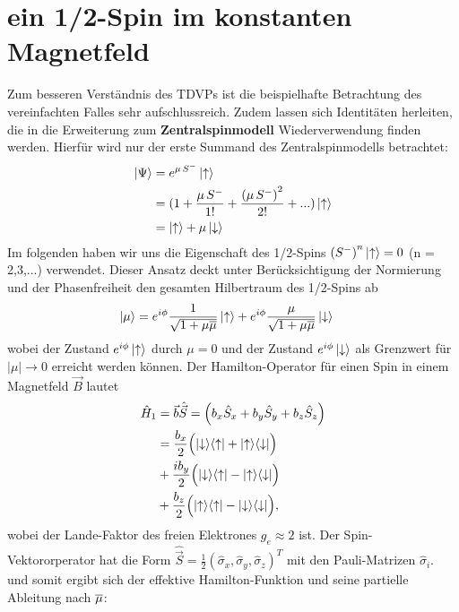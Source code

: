 \section{ein 1/2-Spin im konstanten Magnetfeld}
Zum besseren Verständnis des TDVPs ist die beispielhafte Betrachtung des vereinfachten Falles sehr aufschlussreich. 
Zudem lassen sich Identitäten herleiten, die in die Erweiterung zum \textbf{Zentralspinmodell} Wiederverwendung finden werden. Hierfür wird nur der erste 
Summand des Zentralspinmodells betrachtet:
\begin{align*}
    \ket{\Psi} &= e^{\mu\thinspace S^-}\ket{\uparrow} \\
            &= (1 + \frac{\mu\thinspace S^{-}}{1!} + \frac{\left(\mu\thinspace S^{-}\right)^2}{2!} + ...)\ket{\uparrow}    \\
            &= \ket{\uparrow} + \mu\ket{\downarrow}
\end{align*}
\noindent Im folgenden haben wir uns die Eigenschaft des 1/2-Spins $\left(S^{-}\right)^{n}\ket{\uparrow}=0$  (n = 2,3,...) verwendet.
Dieser Ansatz deckt unter Berücksichtigung der Normierung und der Phasenfreiheit den gesamten Hilbertraum des 1/2-Spins ab
\begin{align}
    \ket{\mu} &= e^{i\phi}\frac{1}{\sqrt{1 + \mu\overline{\mu}}}\ket{\uparrow} + e^{i\phi}\frac{\mu}{\sqrt{1 + \mu\overline{\mu}}}\ket{\downarrow}
\end{align}
wobei der Zustand $e^{i\phi}\ket{\uparrow}$ durch $\mu=0$ und der Zustand $e^{i\phi}\ket{\downarrow}$ als Grenzwert für $|\mu|\rightarrow 0$ erreicht 
werden können. Der Hamilton-Operator für einen Spin in einem Magnetfeld $\vec{B}$ lautet
\begin{align}
    \hat{H}_1 &= \vec{b}\hat{\vec{S}} = \left(b_x\hat{S}_x+b_y\hat{S}_y+b_z\hat{S}_z \right) \\
    &= \frac{b_x}{2}\Bigl(\ket{\downarrow}\!\bra{\uparrow}+\ket{\uparrow}\!\bra{\downarrow}\Bigr) \\
    & + \frac{ib_y}{2}\Bigl(\ket{\downarrow}\!\bra{\uparrow}-\ket{\uparrow}\!\bra{\downarrow}\Bigr) \\
    & + \frac{b_z}{2}\Bigl(\ket{\uparrow}\!\bra{\uparrow}-\ket{\downarrow}\!\bra{\downarrow}\Bigr), 
\end{align}
\noindent wobei der Lande-Faktor des freien Elektrones $g_e\approx 2$ ist. 
Der Spin-Vektororperator hat die Form $\hat{\vec{S}}= \frac{1}{2}\left(\hat{\sigma}_x,\hat{\sigma}_y,\hat{\sigma}_z\right)^T$ mit den Pauli-Matrizen 
$\hat{\sigma}_i$.\\ 
und somit ergibt sich der effektive Hamilton-Funktion und seine partielle Ableitung nach $\overline{\mu}$:
